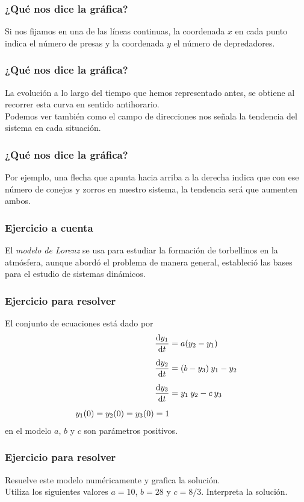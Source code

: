 \begin{frame}
\frametitle{¿Qué nos dice la gráfica?}
Si nos fijamos en una de las líneas continuas, la coordenada $x$ en cada punto indica el número de presas y la coordenada $y$ el número de depredadores.
\end{frame}
\begin{frame}
\frametitle{¿Qué nos dice la gráfica?}
La evolución a lo largo del tiempo que hemos representado antes, se obtiene al recorrer esta curva en sentido antihorario.
\\
\bigskip
Podemos ver también como el campo de direcciones nos señala la tendencia del sistema en cada situación.
\end{frame}
\begin{frame}
\frametitle{¿Qué nos dice la gráfica?}
Por ejemplo, una flecha que apunta hacia arriba a la derecha indica que con ese número de conejos y zorros en nuestro sistema, la tendencia será que aumenten ambos.
\end{frame}
\begin{frame}
\frametitle{Ejercicio a cuenta}
El \emph{modelo de Lorenz} se usa para estudiar la formación de torbellinos en la atmósfera, aunque abordó el problema de manera general, estableció las bases para el estudio de sistemas dinámicos.
\end{frame}
\begin{frame}
\frametitle{Ejercicio para resolver}
El conjunto de ecuaciones está dado por
\begin{align*}
\dv{y_{1}}{t} &= a(y_{2} - y_{1}) \\[0.5em]
\dv{y_{2}}{t} &= (b - y_{3}) \: y_{1} - y_{2} \\[0.5em]
\dv{y_{3}}{t} &= y_{1} \: y_{2} - c \: y_{3} \\[0.5em]
y_{1}(0) = y_{2}(0) = y_{3}(0) = 1
\end{align*}
en el modelo $a$, $b$ y $c$ son parámetros positivos. 
\end{frame}
\begin{frame}
\frametitle{Ejercicio para resolver}
Resuelve este modelo numéricamente y grafica la solución.
\\
\bigskip
Utiliza los siguientes valores $a = 10$, $b = 28$ y $c =8/3$. Interpreta la solución.
\end{frame}
